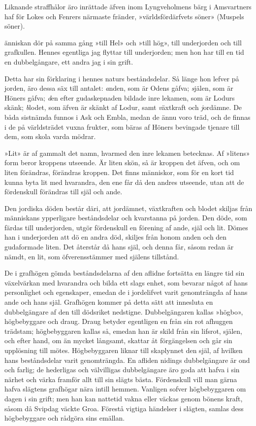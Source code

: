 Liknande straffhålor äro inrättade äfven inom Lyngveholmens bärg i
Amsvartners haf för Lokes och Fenrers närmaste fränder,
»världsfördärfvets söner» (Muspels söner).

\endSecII


\dropcapM änniskan dör på samma gång »till Hel» och »till hög», till underjorden
och till grafkullen. Hennes egentliga jag flyttar till underjorden; men
hon har till en tid en dubbelgångare, ett andra jag i sin grift.

Detta har sin förklaring i hennes naturs beståndsdelar. Så länge hon
lefver på jorden, äro dessa säx till antalet: {\emph anden}, som är Odens
gåfva; {\emph själen}, som är Höners gåfva; {\emph den efter gudaskepnaden
bildade inre lekamen}, som är Lodurs skänk; {\emph blodet}, som äfven är
skänkt af Lodur, samt {\emph växtkraft} och {\emph jordämne.} De båda
sistnämda funnos i Ask och Embla, medan de ännu voro träd, och de finnas
i de på världsträdet vuxna frukter, som bäras af Höners bevingade
tjenare till dem, som skola varda mödrar.

»Lit» är af gammalt det namn, hvarmed den inre lekamen betecknas. Af
»litens» form beror kroppens utseende. Är liten skön, så är kroppen det
äfven, och om liten förändras, förändras kroppen. Det finns människor,
som för en kort tid kunna byta lit med hvarandra, den ene får då den
andres utseende, utan att de fördenskull förändras till själ och ande.

Den jordiska döden består däri, att jordämnet, växtkraften och blodet
skiljas från människans ypperligare beståndsdelar och kvarstanna på
jorden. Den döde, som färdas till underjorden, utgör fördenskull en
förening af ande, själ och lit. Dömes han i underjorden att dö en andra
död, skiljes från honom anden och den gudaformade liten. Det återstår då
hans själ, och denna får, såsom redan är nämdt, en lit, som
öfverensstämmer med själens tillstånd.

De i grafhögen gömda beståndsdelarna af den aflidne fortsätta en längre
tid sin växelvärkan med hvarandra och bilda ett slags enhet, som bevarar
något af hans personlighet och egenskaper, emedan de i jordelifvet varit
genomträngda
af hans ande och hans själ. Grafhögen kommer på detta sätt att innesluta
en dubbelgängare af den till dödsriket nedstigne. Dubbelgängaren kallas
»högbo», högbebyggare och draug. Draug betyder egentligen en från sin
rot afhuggen trädstam; högbebyggaren kallas så, emedan han är skild från
sin lifsrot, själen, och efter hand, om än mycket långsamt, skattar åt
förgängelsen och går sin upplösning till mötes. Högbebyggaren liknar
till skaplynnet den själ, af hvilken hans beståndsdelar varit
genomträngda. En afliden nidings dubbelgängare är ond och farlig; de
hederligas och välvilligas dubbelgängare äro goda att hafva i sin närhet
och värka framför allt till sin slägts bästa. Fördenskull vill man gärna
hafva slägtens grafhögar nära intill hemmen. Vanligen sofver
högbebyggaren om dagen i sin grift; men han kan nattetid vakna eller
väckas genom bönens kraft, såsom då Svipdag väckte Groa. Förestå vigtiga
händelser i slägten, samlas dess högbebyggare och rådgöra sins emällan.

